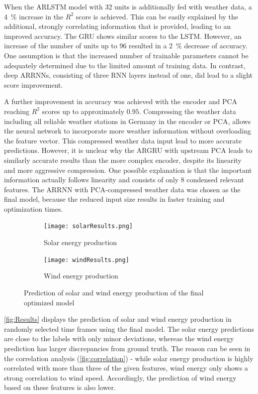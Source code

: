 \documentclass[11pt,table]{article}
\begin{document}
When the ARLSTM model with 32 units is additionally fed with weather data, a \qty{4}{\percent} increase in the $R^2$ score is achieved. This can be easily explained by the additional, strongly correlating information that is provided, leading to an improved accuracy. The \ac{GRU} shows similar scores to the \ac{LSTM}. However, an increase of the number of units up to 96 resulted in a \qty{2}{\percent} decrease of accuracy. One assumption is that the increased number of trainable parameters cannot be adequately determined due to the limited amount of training data. In contrast, deep \acp{ARRNN}, consisting of three \ac{RNN} layers instead of one, did lead to a slight score improvement.

A further improvement in accuracy was achieved with the encoder and \ac{PCA} reaching $R^2$ scores up to approximately $0.95$. Compressing the weather data including all reliable weather stations in Germany in the encoder or \ac{PCA}, allows the neural network to incorporate more weather information without overloading the feature vector. This compressed weather data input lead to more accurate predictions. However, it is unclear why the ARGRU with upstream \ac{PCA} leads to similarly accurate results than the more complex encoder, despite its linearity and more aggressive compression. One possible explanation is that the important information actually follows linearity and consists of only 8 condensed relevant features. The \ac{ARRNN} with \ac{PCA}-compressed weather data was chosen as the final model, because the reduced input size results in faster training and optimization times.

\begin{figure}[p]
\centering
\begin{subfigure}{\textwidth}
  \centering
  \texttt{[image: solarResults.png]}
  \label{fig:ResultsWind}
  \caption{Solar energy production}
\end{subfigure}
\begin{subfigure}{\textwidth}
  \centering
  \texttt{[image: windResults.png]}
  \label{fig:ResultsSolar}
  \caption{Wind energy production}
\end{subfigure}
\caption{Prediction of solar and wind energy production of the final optimized model}
\label{fig:Results}
\end{figure}

\autoref{fig:Results} displays the prediction of solar and wind energy production in randomly selected time frames using the final model. The solar energy predictions are close to the labels with only minor deviations, whereas the wind energy prediction has larger discrepancies from ground truth. The reason can be seen in the correlation analysis (\autoref{fig:correlation}) - while solar energy production is highly correlated with more than three of the given features, wind energy only shows a strong correlation to wind speed. Accordingly, the prediction of wind energy based on these features is also lower.
\end{document}
